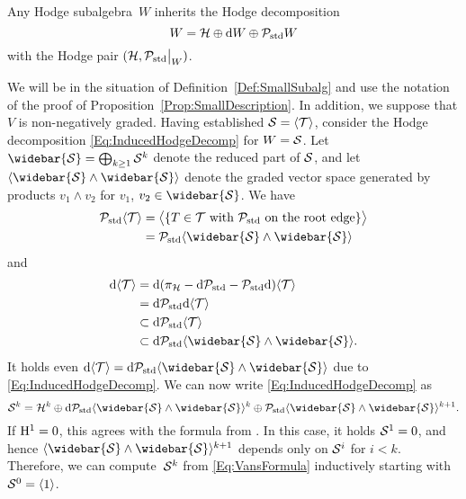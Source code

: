 \documentclass[\MainFolder/Text.tex]{subfiles}
\begin{document}
\begin{Remark}\label{Rem:OnHodgeSubalg}
\begin{RemarkList}
\item Any Hodge subalgebra~$W$ inherits the Hodge decomposition
\begin{equation}\label{Eq:InducedHodgeDecomp}
W = \mathcal{H} \oplus \mathrm{d} W \oplus \mathcal{P}_{\mathrm{std}} W
\end{equation}
with the Hodge pair $(\Harm,\Restr{\HtpStd}{W})$.
\item We will be in the situation of Definition~\ref{Def:SmallSubalg} and use the notation of the proof of Proposition~\ref{Prop:SmallDescription}. In addition, we suppose that $V$ is non-negatively graded. Having established $\mathcal{S} = \langle \mathcal{T} \rangle$, consider the Hodge decomposition \eqref{Eq:InducedHodgeDecomp} for $W = \mathcal{S}$. Let $\widebar{\VansSmall} = \bigoplus_{k\ge 1} \VansSmall^k$ denote the reduced part of $\mathcal{S}$, and let $\langle\widebar{\VansSmall} \wedge \widebar{\VansSmall}\rangle$ denote the graded vector space generated by products $v_1 \wedge v_2$ for $v_1$, $v_2\in \widebar{\VansSmall}$. We have
\begin{align*}
\HtpStd\langle\Trees\rangle &= \bigl\langle\{ T\in \Trees \text{ with }\HtpStd\text{ on the root edge}\}\bigr\rangle \\
&= \HtpStd\langle\widebar{\VansSmall} \wedge \widebar{\VansSmall}\rangle
\end{align*}
and
\begin{align*}
 \Dd\langle\Trees\rangle &= \Dd (\pi_\Harm - \Dd \HtpStd - \HtpStd\Dd)\langle\Trees\rangle \\
 &= \Dd \HtpStd \Dd \langle\Trees\rangle \\
 &\subset \Dd \HtpStd \langle\Trees\rangle \\
 &\subset \Dd \HtpStd\langle\widebar{\VansSmall}\wedge\widebar{\VansSmall}\rangle.
\end{align*}
It holds even $\Dd\langle\Trees\rangle = \Dd\HtpStd\langle\widebar{\VansSmall}\wedge\widebar{\VansSmall}\rangle$ due to \eqref{Eq:InducedHodgeDecomp}. We can now write \eqref{Eq:InducedHodgeDecomp} as 
\begin{equation}\label{Eq:VansFormula}
\VansSmall^k = \Harm^k \oplus \Dd \HtpStd \langle\widebar{\VansSmall}\wedge\widebar{\VansSmall}\rangle^k \oplus \HtpStd \langle\widebar{\VansSmall}\wedge\widebar{\VansSmall}\rangle^{k+1}.
\end{equation}
If $\mathrm{H}^1 = 0$, this agrees with the formula from \cite[Proposition~3.3]{Van2019}. In this case, it holds $\mathcal{S}^1 = 0$, and hence $\langle\widebar{\VansSmall}\wedge\widebar{\VansSmall}\rangle^{k+1}$ depends only on $\mathcal{S}^i$ for $i<k$. Therefore, we can compute~$\mathcal{S}^k$ from \eqref{Eq:VansFormula} inductively starting with $\mathcal{S}^0 = \langle 1\rangle$.

\end{RemarkList}
\end{Remark}
\end{document}
